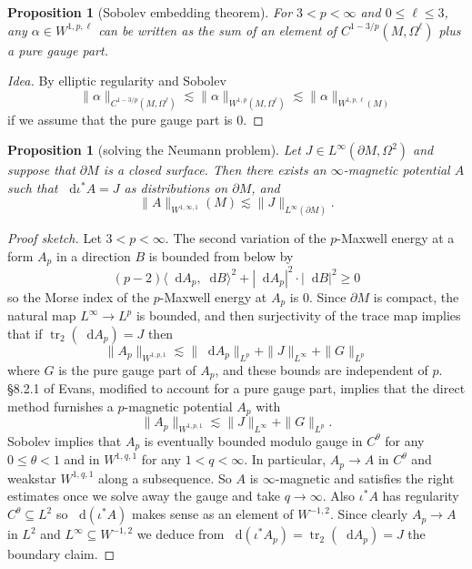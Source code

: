 \documentclass[reqno,11pt]{amsart}
\newcommand*\dif{\mathop{}\!\mathrm{d}}
\DeclareMathOperator{\tr}{tr}
\newtheorem{proposition}[theorem]{Proposition}
\theoremstyle{definition}
\numberwithin{equation}{section}
\begin{document}
\begin{proposition}[Sobolev embedding theorem]
For $3 < p < \infty$ and $0 \leq \ell \leq 3$, any $\alpha \in W^{1, p, \ell}$ can be written as the sum of an element of $C^{1 - 3/p}(M, \Omega^\ell)$ plus a pure gauge part.
\end{proposition}
\begin{proof}[Idea]
By elliptic regularity and Sobolev 
$$\|\alpha\|_{C^{1 - 3/p}(M, \Omega^\ell)} \lesssim \|\alpha\|_{W^{1, p}(M, \Omega^\ell)} \lesssim \|\alpha\|_{W^{1, p, \ell}(M)}$$
if we assume that the pure gauge part is $0$.
\end{proof}

\begin{proposition}[solving the Neumann problem]
Let $J \in L^\infty(\partial M, \Omega^2)$ and suppose that $\partial M$ is a closed surface.
Then there exists an $\infty$-magnetic potential $A$ such that $\dif \iota^* A = J$ as distributions on $\partial M$, and
$$\|A\|_{W^{1, \infty, 1}}(M) \lesssim \|J\|_{L^\infty(\partial M)}.$$
\end{proposition}
\begin{proof}[Proof sketch]
Let $3 < p < \infty$. The second variation of the $p$-Maxwell energy at a form $A_p$ in a direction $B$ is bounded from below by
$$(p - 2) \langle \dif A_p, \dif B\rangle^2 + |\dif A_p|^2 \cdot |\dif B|^2 \geq 0$$
so the Morse index of the $p$-Maxwell energy at $A_p$ is $0$.
Since $\partial M$ is compact, the natural map $L^\infty \to L^p$ is bounded, and then surjectivity of the trace map implies that if $\tr_2(\dif A_p) = J$ then
$$\|A_p\|_{W^{1, p, 1}} \lesssim \|\dif A_p\|_{L^p} + \|J\|_{L^\infty} + \|G\|_{L^p}$$
where $G$ is the pure gauge part of $A_p$, and these bounds are independent of $p$.
\S8.2.1 of Evans, modified to account for a pure gauge part, implies that the direct method furnishes a $p$-magnetic potential $A_p$ with
$$\|A_p\|_{W^{1, p, 1}} \lesssim \|J\|_{L^\infty} + \|G\|_{L^p}.$$
Sobolev implies that $A_p$ is eventually bounded modulo gauge in $C^\theta$ for any $0 \leq \theta < 1$ and in $W^{1, q, 1}$ for any $1 < q < \infty$.
In particular, $A_p \to A$ in $C^\theta$ and weakstar $W^{1, q, 1}$ along a subsequence.
So $A$ is $\infty$-magnetic and satisfies the right estimates once we solve away the gauge and take $q \to \infty$.
Also $\iota^* A$ has regularity $C^\theta \subseteq L^2$ so $\dif (\iota^* A)$ makes sense as an element of $W^{-1, 2}$.
Since clearly $A_p \to A$ in $L^2$ and $L^\infty \subseteq W^{-1, 2}$ we deduce from $\dif(\iota^* A_p) = \tr_2(\dif A_p) = J$ the boundary claim.
\end{proof}
\end{document}
